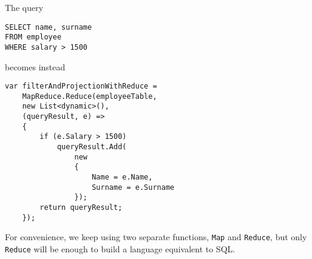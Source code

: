 The query

\begin{lstlisting}
SELECT name, surname
FROM employee
WHERE salary > 1500
\end{lstlisting}

\noindent
becomes instead

\begin{lstlisting}
var filterAndProjectionWithReduce =
	MapReduce.Reduce(employeeTable,
	new List<dynamic>(),
	(queryResult, e) =>
	{
		if (e.Salary > 1500)
			queryResult.Add(
				new
				{
					Name = e.Name,
					Surname = e.Surname
				});
		return queryResult;
	});
\end{lstlisting}

\noindent
For convenience, we keep using two separate functions, \texttt{Map} and \texttt{Reduce}, but only \texttt{Reduce} will be enough to build a language equivalent to SQL.